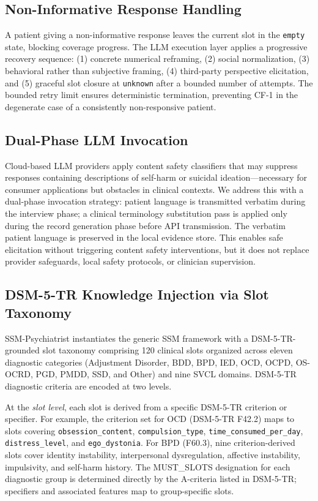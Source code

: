 \documentclass[conference]{IEEEtran}
\begin{document}
\subsection{Non-Informative Response Handling}

A patient giving a non-informative response leaves the current slot in the \texttt{empty} state, blocking coverage progress. The LLM execution layer applies a progressive recovery sequence: (1) concrete numerical reframing, (2) social normalization, (3) behavioral rather than subjective framing, (4) third-party perspective elicitation, and (5) graceful slot closure at \texttt{unknown} after a bounded number of attempts. The bounded retry limit ensures deterministic termination, preventing CF-1 in the degenerate case of a consistently non-responsive patient.

\subsection{Dual-Phase LLM Invocation}

Cloud-based LLM providers apply content safety classifiers that may suppress responses containing descriptions of self-harm or suicidal ideation---necessary for consumer applications but obstacles in clinical contexts. We address this with a dual-phase invocation strategy: patient language is transmitted verbatim during the interview phase; a clinical terminology substitution pass is applied only during the record generation phase before API transmission. The verbatim patient language is preserved in the local evidence store. This enables safe elicitation without triggering content safety interventions, but it does not replace provider safeguards, local safety protocols, or clinician supervision.

\subsection{DSM-5-TR Knowledge Injection via Slot Taxonomy}
\label{sec:dsm_injection}

SSM-Psychiatrist instantiates the generic SSM framework with a DSM-5-TR-grounded slot taxonomy comprising 120 clinical slots organized across eleven diagnostic categories (Adjustment Disorder, BDD, BPD, IED, OCD, OCPD, OS-OCRD, PGD, PMDD, SSD, and Other) and nine SVCL domains. DSM-5-TR diagnostic criteria are encoded at two levels.

At the \textit{slot level}, each slot is derived from a specific DSM-5-TR criterion or specifier. For example, the criterion set for OCD (DSM-5-TR F42.2) maps to slots covering \texttt{obsession\_content}, \texttt{compulsion\_type}, \texttt{time\_consumed\_per\_day}, \texttt{distress\_level}, and \texttt{ego\_dystonia}. For BPD (F60.3), nine criterion-derived slots cover identity instability, interpersonal dysregulation, affective instability, impulsivity, and self-harm history. The MUST\_SLOTS designation for each diagnostic group is determined directly by the A-criteria listed in DSM-5-TR; specifiers and associated features map to group-specific slots.
\end{document}
